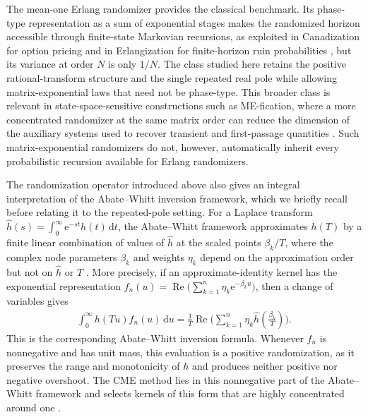 \documentclass[11pt]{article}
\numberwithin{equation}{section}
\theoremstyle{definition}
\theoremstyle{remark}
\newcommand{\dd}{\,\mathrm d}
\newcommand{\e}{\mathrm e}
\begin{document}
The mean-one Erlang randomizer provides the classical benchmark. Its phase-type representation as a sum of exponential stages makes the randomized horizon accessible through finite-state Markovian recursions, as exploited in Canadization for option pricing and in Erlangization for finite-horizon ruin probabilities \cite{carr1998,asmussenavramusabel2002}, but its variance at order $N$ is only $1/N$. The class studied here retains the positive rational-transform structure and the single repeated real pole while allowing matrix-exponential laws that need not be phase-type. This broader class is relevant in state-space-sensitive constructions such as ME-fication, where a more concentrated randomizer at the same matrix order can reduce the dimension of the auxiliary systems used to recover transient and first-passage quantities \cite{akargursoyhorvathtelek2021}. Such matrix-exponential randomizers do not, however, automatically inherit every probabilistic recursion available for Erlang randomizers.



The randomization operator introduced above also gives an integral interpretation of the Abate--Whitt inversion framework, which we briefly recall before relating it to the repeated-pole setting. For a Laplace transform $\widehat h(s)=\int_0^\infty \e^{-st}h(t)\dd t$,
the Abate--Whitt framework approximates $h(T)$ by a finite linear combination of values of $\widehat h$ at the scaled points $\beta_k/T$, where the complex node parameters $\beta_k$ and weights $\eta_k$ depend on the approximation order but not on $\widehat h$ or $T$ \cite{abatewhitt2006}. More precisely, if an approximate-identity kernel has the exponential representation $f_n(u)=\operatorname{Re}\mathopen{{\bigl(}}\sum_{k=1}^n \eta_k\e^{-\beta_k u}\mathclose{{\bigr)}}$,
then a change of variables gives
\begin{align*}
 \int_0^\infty h(Tu)f_n(u)\dd u
 =\frac1T\operatorname{Re}\mathopen{{\biggl(}}\sum_{k=1}^n
   \eta_k\widehat h\!\left(\frac{\beta_k}{T}\right)\mathclose{{\biggr)}}.
\end{align*}
This is the corresponding Abate--Whitt inversion formula. Whenever $f_n$ is nonnegative and has unit mass, this evaluation is a positive randomization, as it preserves the range and monotonicity of $h$ and produces neither positive nor negative overshoot. The CME method lies in this nonnegative part of the Abate--Whitt framework and selects kernels of this form that are highly concentrated around one \cite{horvathtalyigastelek2018,horvathetal2020nilt}.
\end{document}
